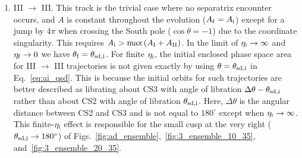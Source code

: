 \documentclass[
        fleqn,
        usenatbib,
    ]{mnras}
\newcommand*{\p}[1]{\left(#1\right)}
\begin{document}
\begin{enumerate}
    \item III $\to$ III\@. This track is the trivial case where no separatrix
        encounter occurs, and $A$ is constant throughout the evolution ($A_{\rm
        f} = A_{\rm i}$) except for a jump by $4\pi$ when crossing the South
        pole ($\cos \theta = -1$) due to the coordinate singularity. This
        requires $A_{\rm i} > \max \p{A_{\rm I} + A_{\rm II}}$. In the limit of
        $\eta_{\rm i} \to \infty$ and $ \eta_{\rm f} \to 0$ we have $\theta_{\rm
        f} = \theta_{\rm sd, i}$. For finite $\eta_{\rm i}$, the initial
        enclosed phase space area for III $\to$ III trajectories is not given
        exactly by using $\theta = \theta_{\rm sd, i}$ in Eq.~\eqref{eq:ai_qsd}.
        This is because the initial orbits for such trajectories are better
        described as librating about CS3 with angle of libration $\Delta \theta
        - \theta_{\rm sd, i}$ rather than about CS2 with angle of libration
        $\theta_{\rm sd, i}$. Here, $\Delta \theta$ is the angular distance
        between CS2 and CS3 and is not equal to $180^\circ$ except when
        $\eta_{\rm i} \to \infty$. This finite-$\eta_{\rm i}$ effect is
        responsible for the small cusp at the very right ($\theta_{\rm sd, i}
        \to 180^\circ$) of
        Figs.~\ref{fig:ad_ensemble},~\ref{fig:3_ensemble_10_35},
        and~\ref{fig:3_ensemble_20_35}.
\end{enumerate}
\end{document}
